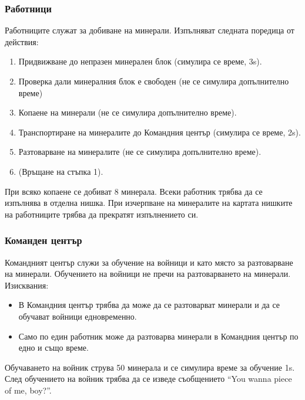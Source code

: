 \documentclass[a4paper,10pt]{article}
\begin{document}
			\subsubsection{Работници}
				Работниците служат за добиване на минерали. Изпълняват следната поредица от действия:
				\begin{enumerate}
					\item Придвижване до непразен минерален блок (симулира се време, 3s).
					\item Проверка дали минералния блок е свободен (не се симулира допълнително време)
					\item Копаене на минерали (не се симулира допълнително време).
					\item Транспортиране на минералите до Командния център (симулира се време, 2s).
					\item Разтоварване на минералите (не се симулира допълнително време).
					\item (Връщане на стъпка 1).
				\end{enumerate}
				При всяко копаене се добиват 8 минерала. Всеки работник трябва да се изпълнява в отделна нишка. При изчерпване на минералите на картата нишките на работниците трябва да прекратят изпълнението си.
			
			\subsubsection{Команден център}
				Командният център служи за обучение на войници и като място за разтоварване на минерали. Обучението на войници не пречи на разтоварването на минерали. Изисквания:
				\begin{itemize}
					\item В Командния център трябва да може да се разтоварват минерали и да се обучават войници едновременно.
					\item Само по един работник може да разтоварва минерали в Командния център по едно и също време.
				\end{itemize}
				Обучаването на войник струва 50 минерала и се симулира време за обучение 1s. След обучението на войник трябва да се изведе съобщението ``You wanna piece of me, boy?''.
\end{document}
